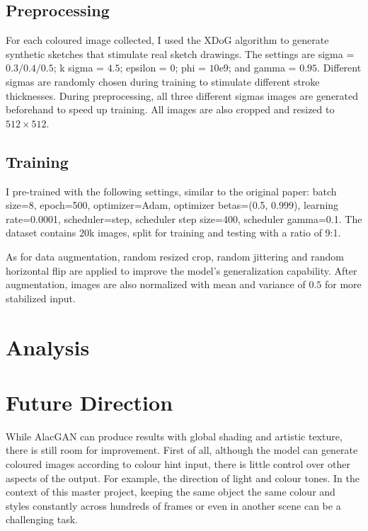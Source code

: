 \subsection{Preprocessing}
For each coloured image collected, I used the XDoG\cite{winnemollerXDoGEXtendedDifferenceofGaussians2012} algorithm to generate synthetic sketches that stimulate real sketch drawings. The settings are sigma = $0.3/0.4/0.5$; k sigma = $4.5$; epsilon = $0$; phi = $10\mathrm{e}9$; and gamma = $0.95$. Different sigmas are randomly chosen during training to stimulate different stroke thicknesses. During preprocessing, all three different sigmas images are generated beforehand to speed up training. All images are also cropped and resized to $512\times512$.

\subsection{Training}
I pre-trained with the following settings, similar to the original paper: batch size=8, epoch=500, optimizer=Adam, optimizer betas=(0.5, 0.999), learning rate=0.0001, scheduler=step, scheduler step size=400, scheduler gamma=0.1. The dataset contains 20k images, split for training and testing with a ratio of 9:1.

As for data augmentation, random resized crop, random jittering and random horizontal flip are applied to improve the model's generalization capability. After augmentation, images are also normalized with mean and variance of $0.5$ for more stabilized input.

\section{Analysis}

\section{Future Direction}
While AlacGAN can produce results with global shading and artistic texture, there is still room for improvement. First of all, although the model can generate coloured images according to colour hint input, there is little control over other aspects of the output. For example, the direction of light and colour tones. In the context of this master project, keeping the same object the same colour and styles constantly across hundreds of frames or even in another scene can be a challenging task.

